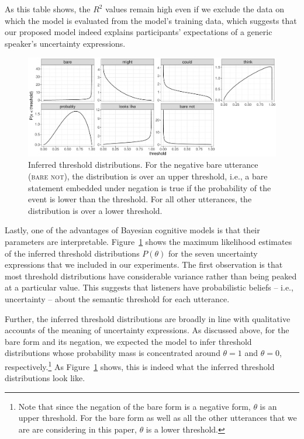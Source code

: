 \documentclass[man, floatsintext]{apa6}
\begin{document}
As this table shows, the $R^2$ values remain high even if we exclude the data on which the model is evaluated from the model's training data, 
which suggests that our proposed model indeed explains
participants' expectations of a generic speaker's uncertainty expressions. 

\begin{figure}[th!]
\includegraphics[width=\textwidth]{plots/threshold-distributions-prior.pdf}
\caption{Inferred threshold distributions. For the negative bare utterance (\textsc{bare not}), the distribution is over an upper threshold, i.e., a bare statement embedded under negation is true if the probability of the event is lower than the threshold. For all other utterances, the distribution is over a lower threshold.
\label{fig:threshold-distributions}}
\end{figure}

Lastly, one of the advantages of Bayesian cognitive models is that their parameters are interpretable. Figure~\ref{fig:threshold-distributions} shows the 
maximum likelihood estimates of the inferred threshold distributions $P(\theta)$ for the seven uncertainty expressions that we included in our experiments.
The first observation is that most threshold distributions have considerable variance rather than being peaked at a particular value. This suggests that
listeners have probabilistic beliefs -- i.e., uncertainty -- about the semantic threshold for each utterance.

Further, the inferred threshold distributions are broadly in line with qualitative accounts of the meaning of uncertainty expressions.
As discussed above, for the bare form and its negation, we expected the model to infer threshold distributions whose probability mass is concentrated 
around $\theta=1$ and $\theta=0$, respectively.\footnote{Note that since the negation of the bare form is a negative form, $\theta$ is an upper threshold. For the bare form as well as
all the other utterances that we are are considering in this paper, $\theta$ is a lower threshold.} As  Figure~\ref{fig:threshold-distributions} shows, this is indeed what
the inferred threshold distributions look like. 
\end{document}
